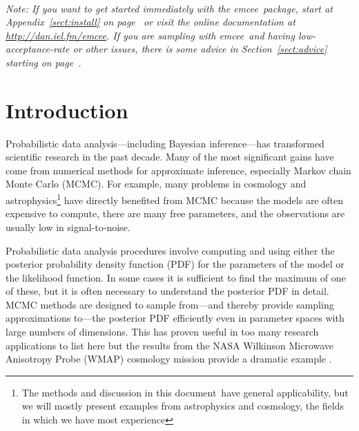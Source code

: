\documentclass[12pt,preprint]{aastex}
\newcommand{\project}[1]{{\sffamily #1}}
\newcommand{\thisplain}{emcee}
\newcommand{\this}{\project{\thisplain}}
\newcommand{\paper}{document}
\newcommand{\Sect}[1]{Section~\ref{sect:#1}}
\newcommand{\sect}[1]{\Sect{#1}}
\newcommand{\App}[1]{Appendix~\ref{sect:#1}}
\newcommand{\app}[1]{\App{#1}}
\begin{document}
~\clearpage

\noindent
\emph{Note: If you want to get started immediately with the \this\ package,
  start at \app{install} on
  page~\pageref{sect:install} or visit the online documentation at
  \url{http://dan.iel.fm/emcee}. If you are sampling with \this\ and having
  low-acceptance-rate or other issues, there is some advice in
  \sect{advice} starting on page~\pageref{sect:advice}.}

\section{Introduction}

Probabilistic data analysis---including Bayesian inference---has
transformed scientific research in the past decade. Many of the most
significant gains have come from numerical methods for approximate
inference, especially Markov chain Monte Carlo (MCMC).  For example,
many problems in cosmology and astrophysics\footnote{The methods and
  discussion in this \paper\ have general applicability, but we will
  mostly present examples from astrophysics and cosmology, the fields
  in which we have most experience} have directly benefited from MCMC
because the models are often expensive to compute, there are many free
parameters, and the observations are usually low in signal-to-noise.

Probabilistic data analysis procedures involve computing and using
either the posterior probability density function (PDF) for the
parameters of the model or the likelihood function. In some cases it
is sufficient to find the maximum of one of these, but it is often
necessary to understand the posterior PDF in detail.  MCMC methods are
designed to sample from---and thereby provide sampling approximations
to---the posterior PDF efficiently even in parameter spaces with large
numbers of dimensions. This has proven useful in too many research
applications to list here but the results from the NASA Wilkinson
Microwave Anisotropy Probe (WMAP) cosmology mission provide a dramatic
example \citep[for example,][]{Dunkley:2005}.
\end{document}
